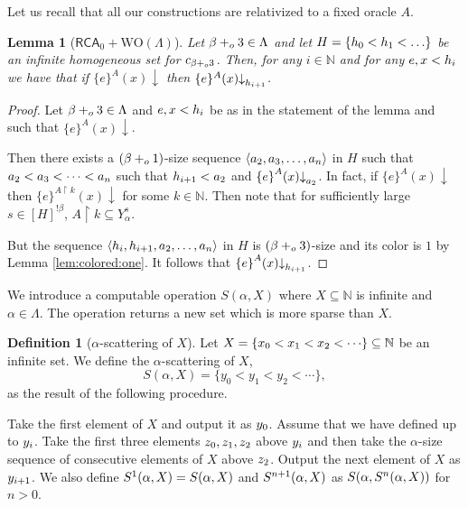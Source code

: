 \documentclass[11pt]{amsart}
\newtheorem{lemma}[thm]{Lemma}
\theoremstyle{definition}
\newtheorem{definition}[thm]{Definition}
\theoremstyle{remark}
\theoremstyle{plain}
\def\la{\langle}
\def\ra{\rangle}
\newcommand{\numberset}{\mathbb}
\newcommand{\N}{\numberset{N}}
\def\a{\alpha}
\newcommand{\RCA}{\mathsf{RCA}_0}
\newcommand{\set}[1]{{\{{#1}\}}}
\def\stops{{\downarrow}}
\def\WO{{\textrm{WO}}}
\newcommand{\restricted}{{\upharpoonright}}
\newcommand{\pluso}{+\sb{o}}
\def\N{{\mathbb{N}}}
\def\stops{{\downarrow}}
\begin{document}
Let us recall that all our constructions are relativized to a fixed oracle $A$.

\begin{lemma}[$\RCA+\WO(\Lambda)$]\label{lem:recursive:stop}
Let $\beta \pluso 3\in \Lambda$ and let $H=\set{h\sb0 < h\sb1 < \dots}$ be an infinite homogeneous set for $c\sb{\beta \pluso 3}$. 
Then, for any $i\in\N$  and for any $e,x<h\sb i$ we have that if $\{e\}^A(x)\stops$ then $\{e\}^A(x) \stops \sb{h\sb{i+1}}$.
\end{lemma}

\begin{proof}
Let $\beta \pluso 3\in \Lambda$ and $e,x<h\sb i$ be as in the statement of the lemma and such that $\set{e}^A(x)\stops$.

Then there exists a $(\beta \pluso 1)$-size sequence $\la a\sb 2, a\sb 3, \dots, a\sb n \ra$ in $H$ such that $a\sb 2 < a\sb 3 < \dots < a\sb n$ such that $h\sb {i+1} < a\sb 2$ and $\set{e}^A(x)\stops\sb{a\sb 2}$. 
In fact, if $\set{e}^A(x)\stops$ then $\set{e}^{A\restricted k}(x)\stops$ for some $k\in\N$. 
Then note that for sufficiently large $s\in [H]^{!\beta}$, $A\restricted k \subseteq Y_\alpha^s$. 

But the sequence $\la h\sb i,h\sb {i+1},a\sb 2,\dots,a\sb n \ra$ in $H$ is $(\beta \pluso 3)$-size and its color is $1$ by Lemma \ref{lem:colored:one}. 
It follows that $\set{e}^A(x)\stops\sb{h\sb {i+1}}$.
\end{proof}

We introduce a computable operation $S(\alpha, X)$ where $X\subseteq\N$ is infinite and $\alpha\in\Lambda$.
The operation returns a new set which is more sparse than $X$. 

\begin{definition}[$\alpha$-scattering of $X$]\label{dfn:set:scattering}
Let $X=\set{x\sb0 < x\sb1 < x\sb2 < \cdots}\subseteq \N$ be an infinite set. 
We define the $\alpha$-scattering of $X$, $$S(\alpha,X)=\{y_0 < y_1 < y_2 < \cdots\},$$ 
as the result of the following procedure.

Take the first element of $X$ and output it as $y\sb0$. 
Assume that we have defined up to $y\sb i$.
Take the first three elements $z\sb 0, z\sb 1, z\sb 2$ above $y\sb i$ and then take the $\a$-size sequence of consecutive elements of $X$ above $z\sb 2$. 
Output the next element of $X$ as  $y\sb{i+1}$.
We also define $S \sp 1 (\alpha,X)= S(\alpha, X)$ and $S \sp {n+1} (\alpha,X)$ as $S(\alpha, S \sp n(\alpha, X))$ for $n>0$.
\end{definition}
\end{document}
